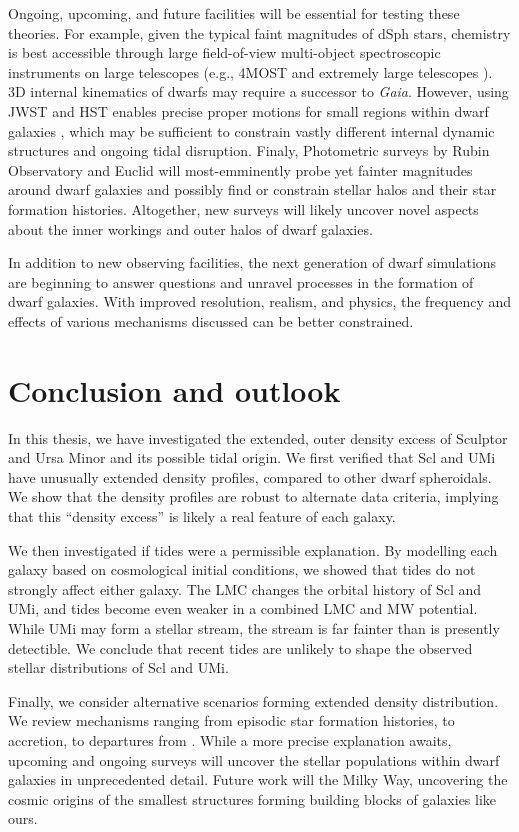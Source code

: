 Ongoing, upcoming, and future facilities will be essential for testing
these theories. For example, given the typical faint magnitudes of dSph
stars, chemistry is best accessible through large field-of-view
multi-object spectroscopic instruments on large telescopes (e.g., 4MOST
and extremely large telescopes \citet{skuladottir+2023}). 3D internal
kinematics of dwarfs may require a successor to \emph{Gaia}. However,
using JWST and HST enables precise proper motions for small regions
within dwarf galaxies \citep[e.g.,][]{vitral+2025}, which may be
sufficient to constrain vastly different internal dynamic structures and
ongoing tidal disruption. Finaly, Photometric surveys by Rubin
Observatory and Euclid will most-emminently probe yet fainter magnitudes
around dwarf galaxies and possibly find or constrain stellar halos and
their star formation histories. Altogether, new surveys will likely
uncover novel aspects about the inner workings and outer halos of dwarf
galaxies.

In addition to new observing facilities, the next generation of dwarf
simulations are beginning to answer questions and unravel processes in
the formation of dwarf galaxies. With improved resolution, realism, and
physics, the frequency and effects of various mechanisms discussed can
be better constrained.

\section{Conclusion and outlook}\label{conclusion-and-outlook}

In this thesis, we have investigated the extended, outer density excess
of Sculptor and Ursa Minor and its possible tidal origin. We first
verified that Scl and UMi have unusually extended density profiles,
compared to other dwarf spheroidals. We show that the density profiles
are robust to alternate data criteria, implying that this ``density
excess'' is likely a real feature of each galaxy.

We then investigated if tides were a permissible explanation. By
modelling each galaxy based on cosmological initial conditions, we
showed that tides do not strongly affect either galaxy. The LMC changes
the orbital history of Scl and UMi, and tides become even weaker in a
combined LMC and MW potential. While UMi may form a stellar stream, the
stream is far fainter than is presently detectible. We conclude that
recent tides are unlikely to shape the observed stellar distributions of
Scl and UMi.

Finally, we consider alternative scenarios forming extended density
distribution. We review mechanisms ranging from episodic star formation
histories, to accretion, to departures from \LCDM{}. While a more
precise explanation awaits, upcoming and ongoing surveys will uncover
the stellar populations within dwarf galaxies in unprecedented detail.
Future work will the Milky Way, uncovering the cosmic origins of the
smallest structures forming building blocks of galaxies like ours.
